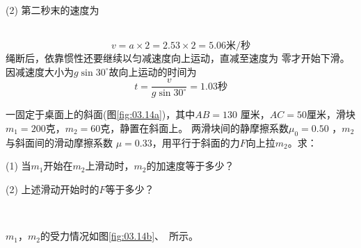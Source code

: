 (2) 第二秒末的速度为

~\vspace{-1.56em}
\begin{equation*}
	v = a \times 2 = 2 . 5 3 \times 2 = 5 . 0 6 \text{米/秒}
\end{equation*}
绳断后，依靠惯性还要继续以匀减速度向上运动，直减至速度为
零才开始下滑。因减速度大小为$  g \sin 3 0 ^ { \circ } $故向上运动的时间为
\begin{equation*}
	t = \frac { v } { g \sin 3 0 ^ { \circ } } = 1 . 0 3\text{秒}
\end{equation*}

\example 一固定于桌面上的斜面(图\ref{fig:03.14a})，其中$  A B = 1 3 0  $
厘米，$  A C = 5 0  $厘米，滑块$  m _ { 1 } = 2 0 0  $克，$  m _ { 2 } = 6 0  $克，静置在斜面上。
两滑块间的静摩擦系数$  \mu _ { 0 } = 0 . 5 0 $ ，$m_2$与斜面间的滑动摩擦系数
$ \mu = 0 . 3 3  $，用平行于斜面的力$ F $向上拉$m_2$。求：

(1) 当$m_1$开始在$m_2$上滑动时，$m_2$的加速度等于多少？

(2) 上述滑动开始时的$ F $等于多少？
\begin{figurex}
	\centering
	\\[-0.5em]
	 \qquad
	\caption{}
	\label{fig:03.14}
\end{figurex}

\solution $m_1$，$m_2$的受力情况如图\ref{fig:03.14b}、~所示。

